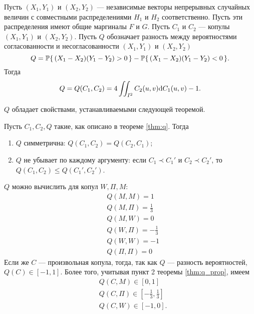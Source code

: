 \begin{theorem}\label{thm:q}
	Пусть $(X_1, Y_1)$ и $(X_2, Y_2)$ --- независимые векторы непрерывных случайных величин с совместными распределениями $H_1$ и $H_2$ соответственно. Пусть эти распределения имеют общие маргиналы $F$ и $G$. Пусть $C_1$ и $C_2$ --- копулы $(X_1, Y_1)$ и $(X_2, Y_2)$. Пусть $Q$ обозначает разность между вероятностями согласованности и несогласованности $(X_1, Y_1)$ и $(X_2, Y_2)$
	\begin{equation}\label{eq:q}
		Q = \P\{\, (X_1 - X_2)(Y_1 - Y_2) > 0 \,\} - \P\{\, (X_1 - X_2)(Y_1 - Y_2) < 0 \,\}.
	\end{equation}
Тогда
\begin{equation}
	Q = Q(C_1, C_2) = 4 \iint_{I^2} C_2(u, v) \d C_1(u,v) - 1.
\end{equation}
\end{theorem}

$Q$ обладает свойствами, устанавливаемыми следующей теоремой.

\begin{theorem}\label{thm:q_prop}
	Пусть $C_1, C_2, Q$ такие, как описано в теореме \ref{thm:q}. Тогда
	\begin{enumerate}
	\item $Q$ симметрична: $Q(C_1, C_2) = Q(C_2, C_1)$;
	\item $Q$ не убывает по каждому аргументу: если $C_1 \prec C_1'$ и $C_2 \prec C_2'$, то $Q(C_1, C_2) \leqslant Q(C_1', C_2')$.
	\end{enumerate}
\end{theorem}

$Q$ можно вычислить для копул $W, \Pi, M$:
\begin{align}
	&Q(M, M) = 1 \\
	&Q(M, \Pi) = \frac{1}{3} \\
	&Q(M, W) = 0 \\
	&Q(W, \Pi) = -\frac{1}{3} \\
	&Q(W, W) = -1 \\
	&Q(\Pi, \Pi) = 0
\end{align}
Если же $C$ --- произвольная копула, тогда, так как $Q$ --- разность вероятностей, $Q(C) \in [-1, 1]$. Более того, учитывая пункт 2 теоремы \ref{thm:q_prop}, имеем
\begin{align}
	&Q(C, M) \in [0, 1] \\
	&Q(C, \Pi) \in [-\frac{1}{3}, \frac{1}{3}]  \\
	&Q(C, W) \in [-1, 0].
\end{align}

